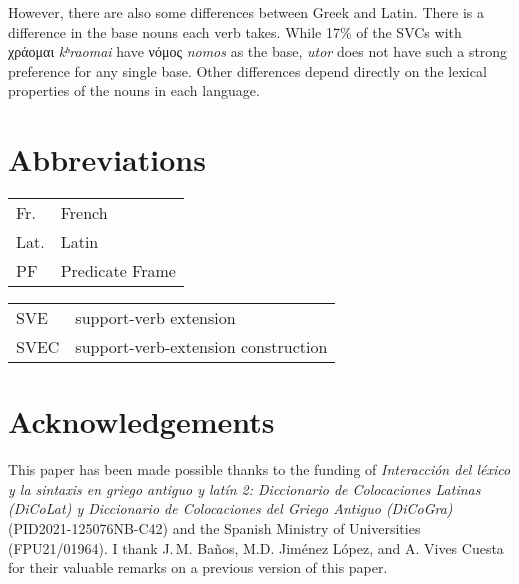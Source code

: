 \documentclass[output=paper,colorlinks,citecolor=brown]{langscibook}
\begin{document}
However, there are also some differences between Greek and Latin. There is a difference in the base nouns each verb takes. While 17\% of
the SVCs with χράομαι \emph{kʰraomai} have νόμος \emph{nomos} as the base,
\emph{utor} does not have such a strong preference for any single base. Other differences
depend directly on the lexical properties of the nouns in each language.

\section*{Abbreviations}
\begin{tabularx}{.45\textwidth}{lQ}
  Fr. & French \\
  Lat.& Latin \\
  PF & Predicate Frame \\
\end{tabularx}
\begin{tabularx}{.45\textwidth}{lQ}
  SVE & support-verb extension \\
  SVEC & support-verb-extension construction \\
\end{tabularx}%

\newpage
\section*{Acknowledgements}

This paper has been made possible thanks to the funding of \emph{Interacción del léxico y
  la sintaxis en griego antiguo y latín 2: Diccionario de Colocaciones Latinas (DiCoLat) y
  Diccionario de Colocaciones del Griego Antiguo (DiCoGra)} (PID2021-125076NB-C42) and the
Spanish Ministry of Universities (FPU21/01964). I thank J.\,M. Baños, M.D. Jiménez López, and
A. Vives Cuesta for their valuable remarks on a previous version of this paper.

 \sloppy
 \printbibliography[heading=subbibliography,notkeyword=this]
\end{document}
